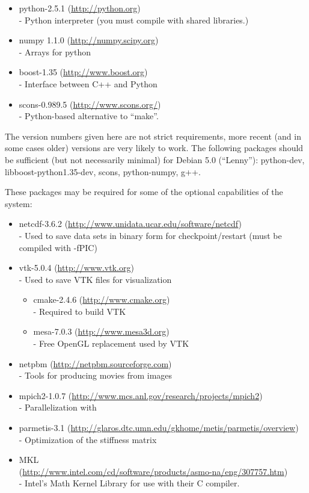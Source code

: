 \begin{itemize}
 \item python-2.5.1 (\url{http://python.org}) \\-
        Python interpreter (you must compile with shared libraries.)
 \item numpy 1.1.0 (\url{http://numpy.scipy.org}) \\-
        Arrays for python
 \item boost-1.35 (\url{http://www.boost.org}) \\-
        Interface between C++ and Python
 \item scons-0.989.5 (\url{http://www.scons.org/}) \\-
        Python-based alternative to ``make''.
\end{itemize}

The version numbers given here are not strict requirements, more recent (and in some cases older) versions are very likely to work.
The following packages should be sufficient (but not necessarily minimal) for Debian 5.0 (``Lenny''):
python-dev, libboost-python1.35-dev, scons, python-numpy, g++.

These packages may be required for some of the optional capabilities of the system:

\begin{itemize}
 \item netcdf-3.6.2 (\url{http://www.unidata.ucar.edu/software/netcdf}) \\-
        Used to save data sets in binary form for checkpoint/restart (must be compiled with -fPIC)
 \item vtk-5.0.4 (\url{http://www.vtk.org}) \\-
        Used to save VTK files for visualization
  \begin{itemize}
   \item cmake-2.4.6 (\url{http://www.cmake.org}) \\-
        Required to build VTK
   \item mesa-7.0.3 (\url{http://www.mesa3d.org})\\-
        Free OpenGL replacement used by VTK
  \end{itemize}
 \item netpbm (\url{http://netpbm.sourceforge.com}) \\-
        Tools for producing movies from images
 \item mpich2-1.0.7 (\url{http://www.mcs.anl.gov/research/projects/mpich2}) \\-
        Parallelization with \mpi
 \item parmetis-3.1 (\url{http://glaros.dtc.umn.edu/gkhome/metis/parmetis/overview}) \\-
        Optimization of the stiffness matrix
 \item MKL \\(\url{http://www.intel.com/cd/software/products/asmo-na/eng/307757.htm}) \\-
        Intel's Math Kernel Library for use with their C compiler.
\end{itemize}

